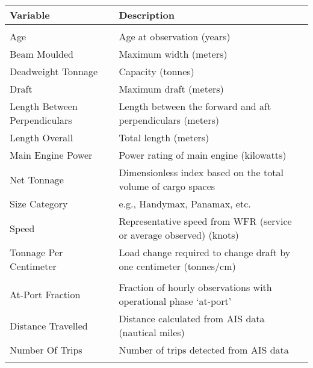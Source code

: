 
\begin{tabular}[t]{>{\raggedright\arraybackslash}p{16em}>{\raggedright\arraybackslash}p{30em}}
\toprule
Variable & Description\\
\midrule
\addlinespace[0.3em]
\multicolumn{2}{l}{\textbf{Ship Characteristics}}\\
\hspace{1em}Age & Age at observation (years)\\
\hspace{1em}Beam Moulded & Maximum width (meters)\\
\hspace{1em}Deadweight Tonnage & Capacity (tonnes)\\
\hspace{1em}Draft & Maximum draft (meters)\\
\hspace{1em}Length Between Perpendiculars & Length between the forward and aft perpendiculars (meters)\\
\hspace{1em}Length Overall & Total length (meters)\\
\hspace{1em}Main Engine Power & Power rating of main engine (kilowatts)\\
\hspace{1em}Net Tonnage & Dimensionless index based on the total volume of cargo spaces\\
\hspace{1em}Size Category & e.g., Handymax, Panamax, etc.\\
\hspace{1em}Speed & Representative speed from \ac{WFR} (service or average observed) (knots)\\
\hspace{1em}Tonnage Per Centimeter & Load change required to change draft by one centimeter (tonnes/cm)\\
\addlinespace[0.3em]
\multicolumn{2}{l}{\textbf{Ship Activity}}\\
\hspace{1em}At-Port Fraction & Fraction of hourly observations with operational phase ‘at-port’\\
\hspace{1em}Distance Travelled & Distance calculated from AIS data (nautical miles)\\
\hspace{1em}Number Of Trips & Number of trips detected from AIS data\\
\addlinespace[0.3em]

\end{tabular}
